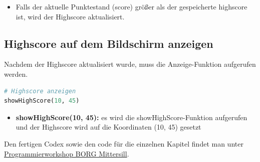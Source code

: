 \documentclass{article}
\begin{document}
\begin{itemize}
\item Falls der aktuelle Punktestand (score) größer als der gespeicherte highscore ist, wird der Highscore aktualisiert.
\end{itemize}


\subsection{Highscore auf dem Bildschirm anzeigen}
Nachdem der Highscore aktualisiert wurde, muss die Anzeige-Funktion aufgerufen werden.

\begin{lstlisting}[style=pythonstyle, language=Python]
# Highscore anzeigen
showHighScore(10, 45)
\end{lstlisting}

\begin{itemize}
\item \textbf{showHighScore(10, 45):} es wird die showHighScore-Funktion aufgerufen und der Highscore wird auf die Koordinaten (10, 45) gesetzt
\end{itemize}


Den fertigen Codex sowie den code für die einzelnen Kapitel findet man unter \href{https://github.com/MG-203/Programmierworkshop-Borg-Mittersill}{Programmierworkshop BORG Mittersill}. 
\end{document}
